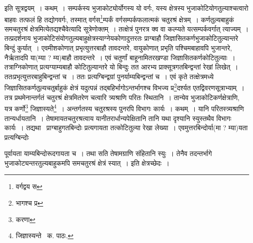 \documentclass[11pt, openany]{book}
\begin{document}
\noindent इति सूत्रद्वयम्~। कथम्~। सम्पर्कस्य भुजाकोट्योर्योगस्य यो वर्गः, यस्य क्षेत्रस्य भुजाकोटियोगतुल्याश्चत्वारो बाहवः तत्फलं हि तद्योगवर्गः, तस्मात् वर्गस\renewcommand{\thefootnote}{१}\footnote{वर्गद्वय स}म्पर्कं वर्गसम्पर्कफलात्मकं चतुरश्रं क्षेत्रम्~। कर्णतुल्यबाहुकं समचतुरश्रं क्षेत्रमित्येतद्यश्चैवेत्यादि सूत्रेणोक्तम्~। तत्क्षेत्रं पुनरत्र क्व वा कल्प्यते यत्सम्पर्कवर्गात् त्याज्यम्~। तत्प्रदर्शनाय भुजाकोटिसंयोगतुल्यबाहुक्षेत्रस्याग्नेयकोणादुत्तरतः प्राग्बाहौ जिज्ञासितकर्णभुजाकोटितुल्यान्तरे बिन्दुं कुर्यात्~। एवमीशकोणात् प्रभृत्युत्तरबाहौ तावदन्तरे, वायुकोणात् प्रभृति पश्चिमबाहावपि भुजान्तरे, नैर्ऋतादपि या(म्या ? म्य)बाहौ तावदन्तरे~। एवं चतुर्णां बाहूनामितरखण्डा जिज्ञासितकर्णकोटितुल्याः~। तत्राग्निकोणात् प्रत्यग्याम्यबाहौ कोटितुल्यान्तरे यो बिन्दुः तत आरभ्य प्राक्सूत्रगतबिन्द्वन्तां रेखां लिखेत्~। ततःप्रभृत्युत्तरबाहुबिन्द्वन्तां च~। ततः प्रत्यग्बिन्द्वग्रां पुनर्याम्यबिन्द्वन्तां च~। एवं कृते तत्क्षेत्रमध्ये जिज्ञासितकर्णतुल्यचतुर्बाहुकं क्षेत्रं यदुत्पन्नं तद्बहिर्भागोऽन्तर्भागश्च विभज्य प्र\renewcommand{\thefootnote}{२}\footnote{भागश्च प्र}दर्श्यत
एतद्विवरणसूत्राभ्याम्~। तत्र प्रथमेनान्तर्गतं चतुरश्रं क्षेत्रमितरेण चत्वारि त्र्यश्राणि परितः स्थितानि~। तान्येव भुजाकोटिकर्णक्षेत्राणि, यत्र कर्णो\renewcommand{\thefootnote}{३}\footnote{करणा} जिज्ञास्यते\renewcommand{\thefootnote}{४}\footnote{जिज्ञास्यन्ते \textendash\ क. पाठः.}~। अन्तर्गतस्य चतुरश्रस्य पुनरपि विभागः कार्यः~। कथम्~। यानि परितस्त्र्यश्राणि तान्यर्धायतानि~। तेषामायतचतुरश्रत्वाय यानीतरार्धान्यपेक्षितानि तानि यथा दृश्यानि स्युस्तथैव विभागः कार्यः~। तद्यथा \textendash\ प्राग्बाहुगतबिन्दोः प्रत्यगायता तत्कोटितुल्या रेखा लेख्या~। एवमुत्तरबिन्दोर्या(मा ? म्या)यता प्रत्यग्बिन्दोः

\newpage

\noindent पूर्वायता याम्यबिन्दोरूदगायता च~। तथा सति तेषामग्राणि संहितानि स्युः~। तेनैव तदन्तर्भागे भुजाकोट्यन्तरतुल्यबाहुकमपि समचतुरश्रं क्षेत्रं स्यात्~। इति क्षेत्रच्छेदः~।\\
\end{document}
